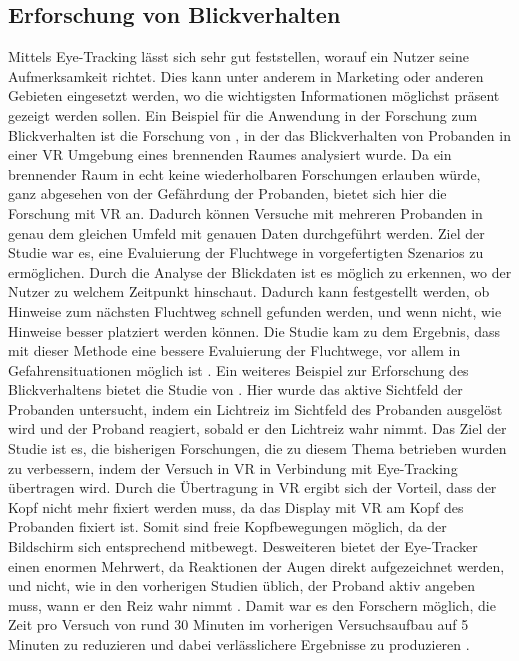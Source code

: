 \subsection{Erforschung von Blickverhalten}
Mittels Eye-Tracking lässt sich sehr gut feststellen, worauf ein Nutzer seine Aufmerksamkeit richtet. Dies kann unter anderem in Marketing \cite{C.Wang.2019} oder anderen Gebieten eingesetzt werden, wo die wichtigsten Informationen möglichst präsent gezeigt werden sollen. 
Ein Beispiel für die Anwendung in der Forschung zum Blickverhalten ist die Forschung von \citeauthor{P.Tian.2019}, in der das Blickverhalten von Probanden in einer VR Umgebung eines brennenden Raumes analysiert wurde. Da ein brennender Raum in echt keine wiederholbaren Forschungen erlauben würde, ganz abgesehen von der Gefährdung der Probanden, bietet sich hier die Forschung mit VR an. Dadurch können Versuche mit mehreren Probanden in genau dem gleichen Umfeld mit genauen Daten durchgeführt werden. Ziel der Studie war es, eine Evaluierung der Fluchtwege in vorgefertigten Szenarios  zu ermöglichen. Durch die Analyse der Blickdaten ist es möglich zu erkennen, wo der Nutzer zu welchem Zeitpunkt hinschaut. Dadurch kann festgestellt werden, ob Hinweise zum nächsten Fluchtweg schnell gefunden werden, und wenn nicht, wie Hinweise besser platziert werden können. Die Studie kam zu dem Ergebnis, dass mit dieser Methode eine bessere Evaluierung der Fluchtwege, vor allem in Gefahrensituationen möglich ist \cite{P.Tian.2019}. 
Ein weiteres Beispiel zur Erforschung des Blickverhaltens bietet die Studie von \citeauthor{K.Hotta.2019}. Hier wurde das aktive Sichtfeld der Probanden untersucht, indem ein Lichtreiz im Sichtfeld des Probanden ausgelöst wird und der Proband reagiert, sobald er den Lichtreiz wahr nimmt. Das Ziel der Studie ist es, die bisherigen Forschungen, die zu diesem Thema betrieben wurden  zu verbessern, indem der Versuch in VR in Verbindung mit Eye-Tracking übertragen wird. Durch die Übertragung in VR ergibt sich der Vorteil, dass der Kopf nicht mehr fixiert werden muss, da das Display mit VR am Kopf des Probanden fixiert ist. Somit sind freie Kopfbewegungen möglich, da der Bildschirm sich entsprechend mitbewegt. Desweiteren bietet der Eye-Tracker einen enormen Mehrwert, da Reaktionen der Augen direkt aufgezeichnet werden, und nicht, wie in den vorherigen Studien üblich, der Proband aktiv angeben muss, wann er den Reiz wahr nimmt . Damit war es den Forschern möglich, die Zeit pro Versuch von rund 30 Minuten im vorherigen Versuchsaufbau auf 5  Minuten zu reduzieren und dabei verlässlichere Ergebnisse zu produzieren \cite{K.Hotta.2019} . 

